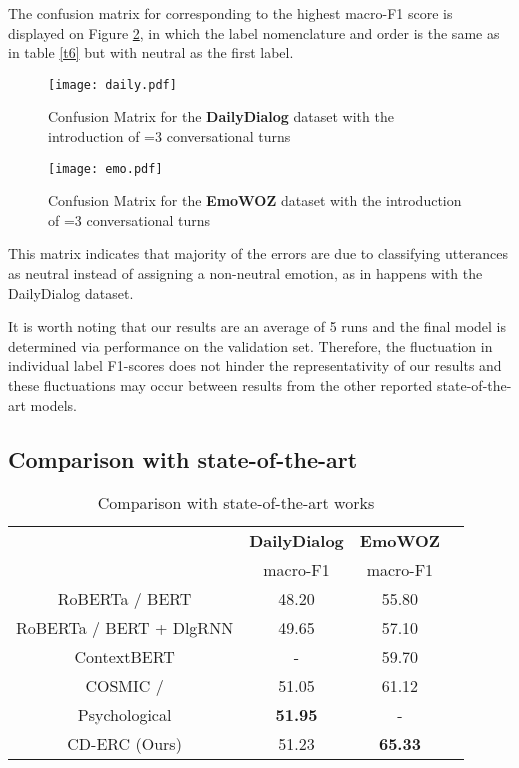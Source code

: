 \documentclass[11pt]{article}
\begin{document}
The confusion matrix for  corresponding to the highest macro-F1 score is displayed on Figure \ref{c2}, in which the label nomenclature and order is the same as in table \ref{t6} but with neutral as the first label. 

\begin{figure}[ht]
    \centering
   \texttt{[image: daily.pdf]}
\caption{Confusion Matrix for the  \textbf{DailyDialog} dataset with the introduction of =3 conversational turns}
\label{c3}
\end{figure}

\begin{figure}[ht]
    \centering
   \texttt{[image: emo.pdf]}
\caption{Confusion Matrix for the  \textbf{EmoWOZ} dataset with the introduction of =3 conversational turns}
\label{c2}
\end{figure}


This matrix indicates that majority of the errors are due to classifying utterances as neutral instead of assigning a non-neutral emotion, as in happens with the DailyDialog dataset. 

\vspace{2.5mm}

It is worth noting that our results are an average of 5 runs and the final model is determined via performance on the validation set. Therefore, the fluctuation in individual label F1-scores does not hinder the representativity of our results and these fluctuations may occur between results from the other reported state-of-the-art models.

\subsection{Comparison with state-of-the-art}
\begin{table*}[t]
 \centering
 \caption{Comparison with state-of-the-art works}
  \begin{tabular}{cccc}
    \hline
       &\textbf{DailyDialog} & \textbf{EmoWOZ}\\
       &macro-F1 & macro-F1 \\
    \hline
    RoBERTa \cite{ghosal-etal-2020-cosmic} / BERT \cite{feng2022emowoz} &48.20&55.80\\
    RoBERTa \cite{ghosal-etal-2020-cosmic} / BERT \cite{feng2022emowoz} + DlgRNN  &49.65&57.10\\
    ContextBERT \cite{feng2022emowoz} &-&59.70\\
    COSMIC \cite{ghosal-etal-2020-cosmic} / \cite{feng2022emowoz}&51.05&61.12\\
    Psychological \cite{li-etal-2021-past-present}&\textbf{51.95}&-\\
    \hline
    CD-ERC (Ours)&51.23&\textbf{65.33} \\

    
    \hline
  \end{tabular} 
 \label{t5}
\end{table*} 
\end{document}
